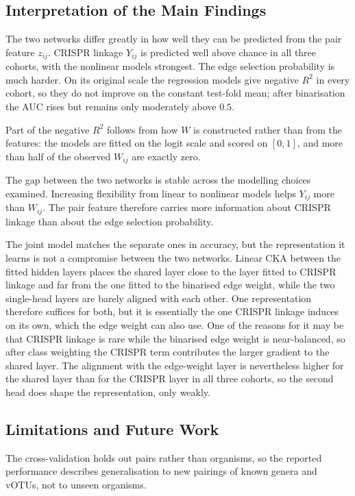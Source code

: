 \subsection{Interpretation of the Main Findings}
The two networks differ greatly in how well they can be predicted from the pair feature \(z_{ij}\).
CRISPR linkage \(Y_{ij}\) is predicted well above chance in all three cohorts, with the nonlinear models
strongest. The edge selection probability is much harder. On its original scale the regression models give
negative \(R^{2}\) in every cohort, so they do not improve on the constant test-fold mean; after
binarisation the AUC rises but remains only moderately above \(0.5\).

Part of the negative \(R^{2}\) follows from how \(W\) is constructed rather than from the features: the
models are fitted on the logit scale and scored on \([0,1]\), and more than half of the observed
\(W_{ij}\) are exactly zero.

The gap between the two networks is stable across the modelling choices examined. Increasing flexibility
from linear to nonlinear models helps \(Y_{ij}\) more than \(W_{ij}\). The pair
feature therefore carries more information about CRISPR linkage than about the edge selection probability.

The joint model matches the separate ones in accuracy, but the representation it learns is not a
compromise between the two networks. Linear CKA between the fitted hidden layers places the shared layer
close to the layer fitted to CRISPR linkage and far from the one fitted to the
binarised edge weight, while the two single-head layers are barely aligned with
each other. One representation therefore suffices for both, but it is
essentially the one CRISPR linkage induces on its own, which the edge weight can also use. One of the reasons for it
may be that CRISPR linkage is rare while the binarised edge weight is near-balanced, so after class
weighting the CRISPR term contributes the larger gradient to the shared layer. The alignment with the
edge-weight layer is nevertheless higher for the shared layer than for the CRISPR layer in all three
cohorts, so the second head does shape the representation, only weakly.

\subsection{Limitations and Future Work}
The cross-validation holds out pairs rather than organisms, so the reported performance describes
generalisation to new pairings of known genera and vOTUs, not to unseen organisms.

